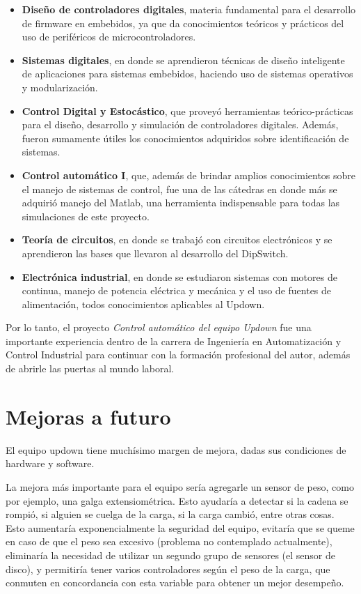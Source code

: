 \begin{itemize}
	\item \textbf{Diseño de controladores digitales}, materia fundamental para el desarrollo de firmware en embebidos, ya que da conocimientos teóricos y prácticos del uso de periféricos de microcontroladores. 
	\item \textbf{Sistemas digitales}, en donde se aprendieron técnicas de diseño inteligente de aplicaciones para sistemas embebidos, haciendo uso de sistemas operativos y modularización.	
	\item \textbf{Control Digital y Estocástico}, que proveyó herramientas teórico-prácticas para el diseño, desarrollo y simulación de controladores digitales. Además, fueron sumamente útiles los conocimientos adquiridos sobre identificación de sistemas.
	\item \textbf{Control automático I}, que, además de brindar amplios conocimientos sobre el manejo de sistemas de control, fue una de las cátedras en donde más se adquirió manejo del Matlab, una herramienta indispensable para todas las simulaciones de este proyecto.
	\item \textbf{Teoría de circuitos}, en donde se trabajó con circuitos electrónicos y se aprendieron las bases que llevaron al desarrollo del DipSwitch.
	\item \textbf{Electrónica industrial}, en donde se estudiaron sistemas con motores de continua, manejo de potencia eléctrica y mecánica y el uso de fuentes de alimentación, todos conocimientos aplicables al Updown.
\end{itemize}

Por lo tanto, el proyecto \textit{Control automático del equipo Updown} fue una importante experiencia dentro de la carrera de Ingeniería en Automatización y Control Industrial para continuar con la formación profesional del autor, además de abrirle las puertas al mundo laboral. 
 
\section{Mejoras a futuro} \label{sec:\thesection}

El equipo updown tiene muchísimo margen de mejora, dadas sus condiciones de hardware y software. 

La mejora más importante para el equipo sería agregarle un sensor de peso, como por ejemplo, una galga extensiométrica. Esto ayudaría a detectar si la cadena se rompió, si alguien se cuelga de la carga, si la carga cambió, entre otras cosas. Esto aumentaría exponencialmente la seguridad del equipo, evitaría que se queme en caso de que el peso sea excesivo (problema no contemplado actualmente), eliminaría la necesidad de utilizar un segundo grupo de sensores (el sensor de disco), y permitiría tener varios controladores según el peso de la carga, que conmuten en concordancia con esta variable para obtener un mejor desempeño.

